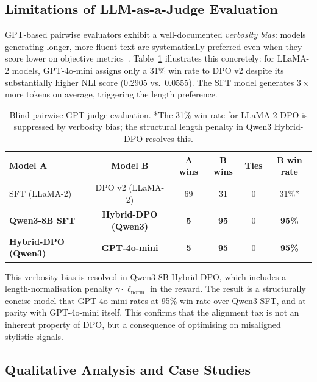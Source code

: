 \subsection{Limitations of LLM-as-a-Judge Evaluation}
\label{sec:gpt_judge_limitations}

GPT-based pairwise evaluators exhibit a well-documented \emph{verbosity bias}: models generating longer, more fluent text are systematically preferred even when they score lower on objective metrics~\cite{zheng2023judging}. Table~\ref{tab:pairwise_1} illustrates this concretely: for LLaMA-2 models, GPT-4o-mini assigns only a 31\% win rate to DPO v2 despite its substantially higher NLI score (0.2905 vs.\ 0.0555). The SFT model generates $3\times$ more tokens on average, triggering the length preference.

\begin{table}[h]
\centering
\small
\begin{tabular}{l|c|c|c|c|c}
\toprule
Model A & Model B & A wins & B wins & Ties & B win rate \\
\midrule
SFT (LLaMA-2) & DPO v2 (LLaMA-2) & 69 & 31 & 0 & 31\%* \\
\textbf{Qwen3-8B SFT} & \textbf{Hybrid-DPO (Qwen3)} & \textbf{5} & \textbf{95} & 0 & \textbf{95\%} \\
\textbf{Hybrid-DPO (Qwen3)} & \textbf{GPT-4o-mini} & \textbf{5} & \textbf{95} & 0 & \textbf{95\%} \\
\bottomrule
\end{tabular}
\caption{Blind pairwise GPT-judge evaluation. *The 31\% win rate for LLaMA-2 DPO is suppressed by verbosity bias; the structural length penalty in Qwen3 Hybrid-DPO resolves this.}
\label{tab:pairwise_1}
\end{table}

This verbosity bias is resolved in Qwen3-8B Hybrid-DPO, which includes a length-normalisation penalty $\gamma \cdot \ell_{\text{norm}}$ in the reward. The result is a structurally concise model that GPT-4o-mini rates at 95\% win rate over Qwen3 SFT, and at parity with GPT-4o-mini itself. This confirms that the alignment tax is not an inherent property of DPO, but a consequence of optimising on misaligned stylistic signals.

\subsection{Qualitative Analysis and Case Studies}

